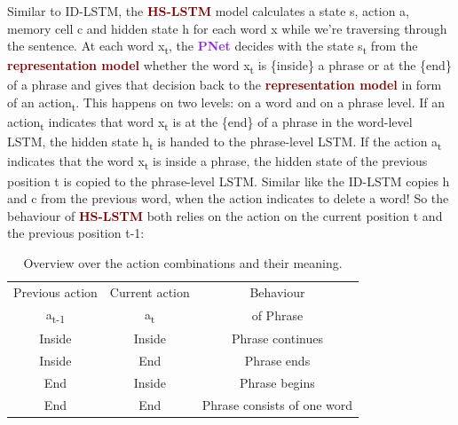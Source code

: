 \documentclass{article}
\begin{document}
Similar to ID-LSTM, the \textcolor{Maroon}{\textbf{HS-LSTM}} model calculates a state s, action a, memory cell c and hidden state h for each word x while we're traversing through the sentence. At each word x\textsubscript{t}, the \textcolor{BlueViolet}{\textbf{PNet}} decides with the state s\textsubscript{t} from the \textcolor{Maroon}{\textbf{representation model}} whether the word x\textsubscript{t} is \{inside\} a phrase or at the \{end\} of a phrase and gives that decision back to the \textcolor{Maroon}{\textbf{representation model}} in form of an action\textsubscript{t}. This happens on two levels: on a word and on a phrase level. If an action\textsubscript{t} indicates that word x\textsubscript{t} is at the \{end\} of a phrase in the word-level LSTM, the hidden state h\textsubscript{t} is handed to the phrase-level LSTM. If the action a\textsubscript{t} indicates that the word x\textsubscript{t} is inside a phrase, the hidden state of the previous position t is copied to the phrase-level LSTM. Similar like the ID-LSTM copies h and c from the previous word, when the action indicates to delete a word! So the behaviour of \textcolor{Maroon}{\textbf{HS-LSTM}} both relies on the action on the current position t and the previous position t-1:\\
\begin{table}[h]
    \centering
    \begin{tabular}{cc|c}
        Previous action & Current action & Behaviour\\
         a\textsubscript{t-1} & a\textsubscript{t} & of Phrase \\
         \hline
        Inside & Inside & Phrase continues \\
        Inside & End & Phrase ends \\
        End & Inside & Phrase begins \\
        End & End & Phrase consists of one word \\
    \end{tabular}
    \caption{Overview over the action combinations and their meaning.}
\end{table}
\end{document}

